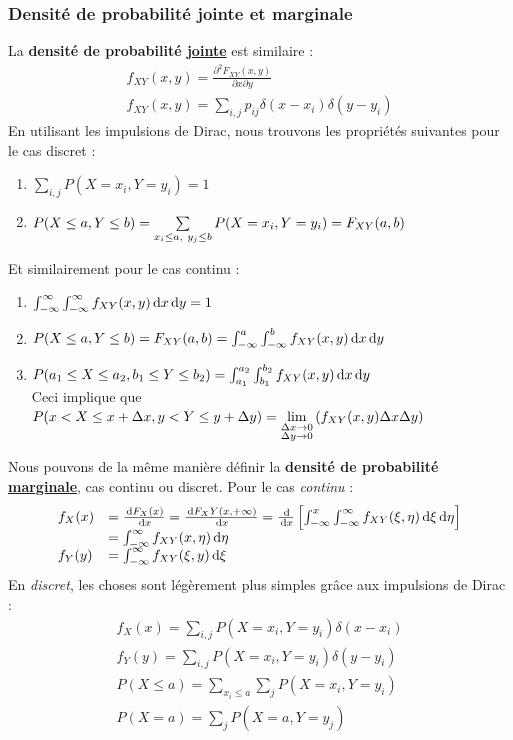 \documentclass[11pt,a4paper]{article}
\numberwithin{equation}{section}
\begin{document}
\subsubsection{Densité de probabilité jointe et marginale}
La \textbf{densité de probabilité \uline{jointe}} est similaire : 
\begin{align}
	f_{XY}(x,y) = \frac{\partial^2F_{XY}(x,y)}{\partial x\partial y}\\
	f_{XY}(x,y) = \sum_{i,j}p_{ij}\delta(x-x_i)\delta(y-y_i)
\end{align}
En utilisant les impulsions de Dirac, nous trouvons les propriétés suivantes pour le cas discret :
\begin{enumerate}[resume,label=P\arabic*.]
    \item $\sum_{i,j} P(X=x_i, Y=y_i) = 1$
    \item $P(X\leq a, Y \leq b) = \sum\limits_{x_i \leq a,\ y_j \leq b}^{} P(X = x_i,Y=y_i) = F_{XY}(a,b)$
\end{enumerate}
Et similairement pour le cas continu :
\begin{enumerate}[resume,label=P\arabic*.]
    \item $\int_{-\infty}^{\infty}\int_{-\infty}^{\infty} f_{XY}(x,y) \, \mathrm d x \, \mathrm d y = 1$
    \item $P(X \leq a, Y \leq b) = F_{XY}(a,b) = \int_{-\infty}^a\int_{-\infty}^b f_{XY}(x,y) \, \mathrm d x \, \mathrm d y$
    \item $P(a_1 \leq X \leq a_2, b_1 \leq Y \leq b_2) = \int_{a_1}^{a_2}\int_{b_1}^{b_2} f_{XY}(x,y)\, \mathrm d x\, \mathrm d y$\\Ceci implique que $P(x < X \leq x+\Delta x, y < Y \leq y+\Delta y) = \lim\limits_{\substack{\Delta x \to 0 \\ \Delta y\to 0}}\left(f_{XY}(x,y)\Delta x \Delta y\right) $
\end{enumerate}
Nous pouvons de la même manière définir la \textbf{densité de probabilité \uline{marginale}}, cas continu ou discret.
Pour le cas \textit{continu} :
\begin{equation}
\begin{array}{ll}
	f_X(x) &= \frac{\, \mathrm d F_X(x)}{\, \mathrm d x} = \frac{\, \mathrm d F_XY(x,+\infty)}{\, \mathrm d x} =\frac{\, \mathrm d }{\, \mathrm d x} \left[\int_{-\infty}^x\int_{-\infty}^{\infty} f_{XY}(\xi,\eta)\, \mathrm d \xi\, \mathrm d \eta\right]\\
			&=\int_{-\infty}^{\infty} f_{XY}(x,\eta)\, \mathrm d \eta\\
	f_Y(y) &= \int_{-\infty}^{\infty} f_{XY}(\xi,y)\, \mathrm d \xi
\end{array}
\end{equation}
En \textit{discret}, les choses sont légèrement plus simples grâce aux impulsions de Dirac :
\[\begin{array}{l}
    f_X(x) = \sum_{i,j} P(X=x_i, Y=y_i)\delta (x-x_i)\\
    f_Y(y) = \sum_{i,j} P(X=x_i, Y=y_i)\delta (y-y_i)\\
    P(X \leq a) = \sum_{x_i \leq a}\sum_j P(X=x_i,Y=y_i)\\
    P(X=a) = \sum_j P(X=a,Y=y_j)
\end{array}\]
\end{document}
